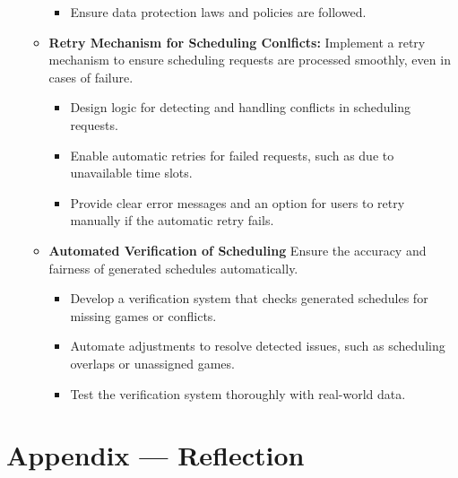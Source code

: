 \documentclass{article}
\begin{document}
\begin{enumerate}
\begin{itemize}
\begin{itemize}
				\item Ensure data protection laws and policies are followed.
			\end{itemize}
            \item \textbf{Retry Mechanism for Scheduling Conlficts:} Implement a retry mechanism to ensure scheduling requests are processed smoothly, even in cases of failure.
			\begin{itemize}
				\item Design logic for detecting and handling conflicts in scheduling requests.
				\item Enable automatic retries for failed requests, such as due to unavailable time slots.
				\item Provide clear error messages and an option for users to retry manually if the automatic retry fails.
			\end{itemize}
            \item \textbf{Automated Verification of Scheduling} Ensure the accuracy and fairness of generated schedules automatically.
			\begin{itemize}
				\item Develop a verification system that checks generated schedules for missing games or conflicts.
				\item Automate adjustments to resolve detected issues, such as scheduling overlaps or unassigned games.
				\item Test the verification system thoroughly with real-world data.
			\end{itemize}

		\end{itemize}
\end{enumerate}

\newpage{}

\section*{Appendix --- Reflection}


\end{document}

